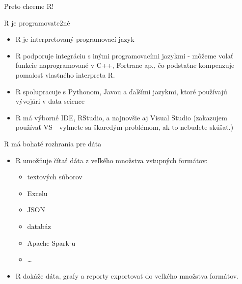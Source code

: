 \begin{frame}{Preto chceme R!}
	\begin{block}{R je programovate2né}
		\begin{itemize}
			\item R je interpretovaný programovací jazyk
			\item R podporuje integráciu s inými programovacími jazykmi - môžeme volať funkcie naprogramované v C++, Fortrane ap., čo podstatne kompenzuje pomalosť vlastného interpreta R.
			\item R spolupracuje s Pythonom, Javou a ďalšími jazykmi, ktoré používajú vývojári v data science
			\item R má výborné IDE, RStudio, a najnovšie aj Visual Studio (\alert{zakazujem používať VS} - vyhnete sa škaredým problémom, ak to nebudete skúšať.)
		\end{itemize}
	\end{block}
	\begin{block}{R má bohaté rozhrania pre dáta}
		\begin{itemize}
			\item R umožňuje čítať dáta z veľkého množstva vstupných formátov:
			\begin{itemize}
				\item textových súborov
				\item Excelu
				\item JSON
				\item databáz
				\item Apache Spark-u
				\item \dots
			\end{itemize}
			\item R dokáže dáta, grafy a reporty exportovať do veľkého množstva formátov.
		\end{itemize}
	\end{block}
\end{frame}

